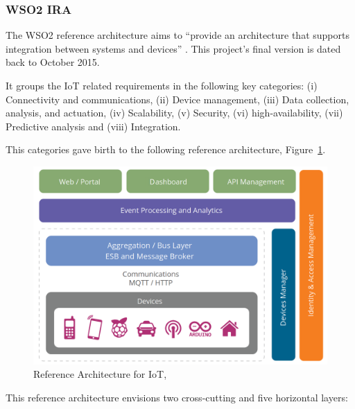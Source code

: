 \subsubsection{WSO2 IRA}
\label{subsubsec:stateofart:arch:wso2}

The WSO2 reference architecture aims to ``provide an architecture that supports integration between systems and devices'' \parencite{wso2ira}. This project's final version is dated back to October 2015.

It groups the \gls{IoT} related requirements in the following key categories: (i) Connectivity and communications, (ii) Device management, (iii) Data collection, analysis, and actuation, (iv) Scalability, (v) Security, (vi) high-availability, (vii) Predictive analysis and (viii) Integration.

This categories gave birth to the following reference architecture, Figure~\ref{fig:stateofart:arch:wso2:ra}.

\begin{figure}[H]
    \centering
    \includegraphics[scale=0.4]{
        assets/figures/wso2-ira.png
    }
    \caption[WSO2 Reference Architecture for IoT]{Reference Architecture for IoT, \cite{wso2ira}}
    \label{fig:stateofart:arch:wso2:ra}
\end{figure}

This reference architecture envisions two cross-cutting and five horizontal layers:

